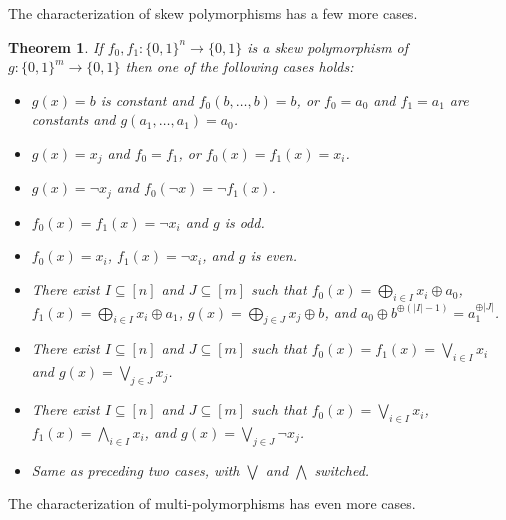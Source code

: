 \documentclass{article}
\newtheorem{theorem}{Theorem}[section]
\theoremstyle{definition}
\theoremstyle{remark}
\providecommand{\biglor}{\bigvee}
\providecommand{\bigland}{\bigwedge}
\begin{document}
The characterization of skew polymorphisms has a few more cases.

\begin{theorem} \label{thm:exact-skew-polymorphisms}
If $f_0,f_1\colon \{0,1\}^n \to \{0,1\}$ is a skew polymorphism of $g\colon \{0,1\}^m \to \{0,1\}$ then one of the following cases holds:
\begin{itemize}
    \item $g(x) = b$ is constant and $f_0(b,\ldots,b) = b$, or $f_0 = a_0$ and $f_1 = a_1$ are constants and $g(a_1,\ldots,a_1) = a_0$.
    \item $g(x) = x_j$ and $f_0 = f_1$, or $f_0(x) = f_1(x) = x_i$.
    \item $g(x) = \lnot x_j$ and $f_0(\lnot x) = \lnot f_1(x)$.
    \item $f_0(x) = f_1(x) = \lnot x_i$ and $g$ is odd.
    \item $f_0(x) = x_i$, $f_1(x) = \lnot x_i$, and $g$ is even.
    \item There exist $I \subseteq [n]$ and $J \subseteq [m]$ such that $f_0(x) = \bigoplus_{i \in I} x_i \oplus a_0$, $f_1(x) = \bigoplus_{i \in I} x_i \oplus a_1$, $g(x) = \bigoplus_{j \in J} x_j \oplus b$, and $a_0 \oplus b^{\oplus (|I|-1)} = a_1^{\oplus |J|}$.
    \item There exist $I \subseteq [n]$ and $J \subseteq [m]$ such that $f_0(x) = f_1(x) = \biglor_{i \in I} x_i$ and $g(x) = \biglor_{j \in J} x_j$.
    \item There exist $I \subseteq [n]$ and $J \subseteq [m]$ such that $f_0(x) = \biglor_{i \in I} x_i$, $f_1(x) = \bigland_{i \in I} x_i$, and $g(x) = \biglor_{j \in J} \lnot x_j$.
    \item Same as preceding two cases, with $\biglor$ and $\bigland$ switched.
\end{itemize}
\end{theorem}

The characterization of multi-polymorphisms has even more cases.
\end{document}
